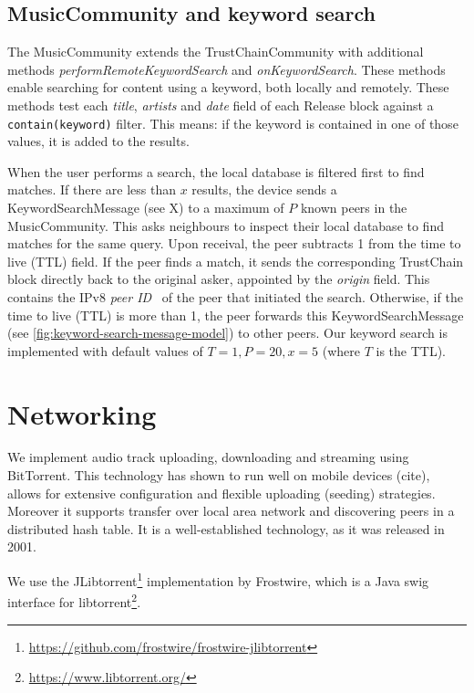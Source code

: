 \subsection{MusicCommunity and keyword search}
\label{sec:searching-musiccommunity-impl}
The MusicCommunity extends the TrustChainCommunity with additional methods \textit{performRemoteKeywordSearch} and \textit{onKeywordSearch}. These methods enable searching for content using a keyword, both locally and remotely. These methods test each \textit{title}, \textit{artists} and \textit{date} field of each Release block against a \verb|contain(keyword)| filter. This means: if the keyword is contained in one of those values, it is added to the results.

When the user performs a search, the local database is filtered first to find matches. If there are less than \(x\) results, the device sends a KeywordSearchMessage (see X) to a maximum of \(P\) known peers in the MusicCommunity. This asks neighbours to inspect their local database to find matches for the same query. Upon receival, the peer subtracts 1 from the time to live (TTL) field. If the peer finds a match, it sends the corresponding TrustChain block directly back to the original asker, appointed by the \textit{origin} field. This contains the IPv8 \textit{peer ID}~\citep{mattskala2020} of the peer that initiated the search. Otherwise, if the time to live (TTL) is more than 1, the peer forwards this KeywordSearchMessage (see \ref{fig:keyword-search-message-model}) to other peers. Our keyword search is implemented with default values of \(T=1, P=20, x=5\) (where \(T\) is the TTL).

\section{Networking}
We implement audio track uploading, downloading and streaming using BitTorrent. This technology has shown to run well on mobile devices (cite), allows for extensive configuration and flexible uploading (seeding) strategies. Moreover it supports transfer over local area network and discovering peers in a distributed hash table. It is a well-established technology, as it was released in 2001.

We use the JLibtorrent\footnote{\url{https://github.com/frostwire/frostwire-jlibtorrent}} implementation by Frostwire, which is a Java swig interface for libtorrent\footnote{\url{https://www.libtorrent.org/}}.
